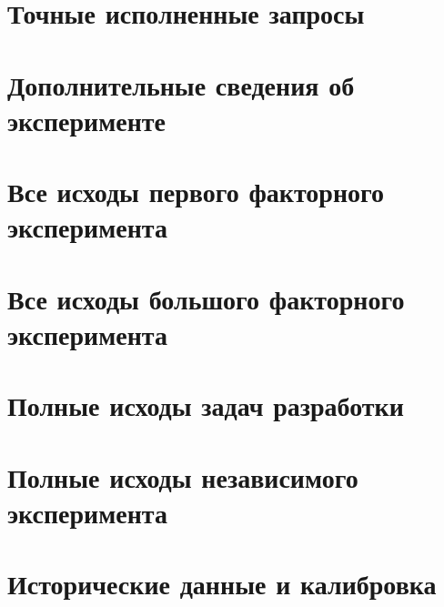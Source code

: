 \section{Точные исполненные запросы}


\clearpage\section{Дополнительные сведения об эксперименте}\label{app:experimental-details}

\clearpage\section{Все исходы первого факторного эксперимента}

\clearpage\section{Все исходы большого факторного эксперимента}

\clearpage\section{Полные исходы задач разработки}

\clearpage\section{Полные исходы независимого эксперимента}

\clearpage


\clearpage\section{Исторические данные и калибровка}


